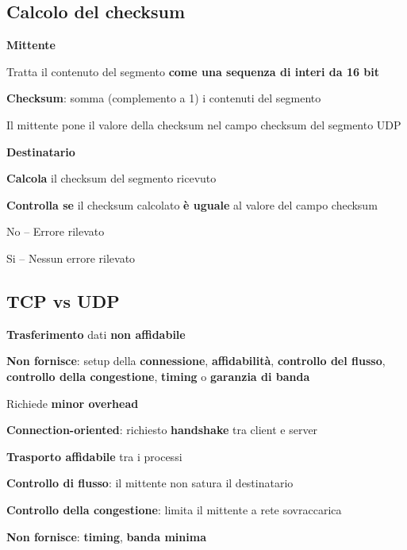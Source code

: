 \documentclass[10pt]{article}
\begin{document}
\subsection{Calcolo del checksum}
\textbf{Mittente}
\begin{list}{}{}
\item Tratta il contenuto del segmento \textbf{come una sequenza di interi da 16 bit}
\item \textbf{Checksum}: somma (complemento a 1) i contenuti del segmento
\item Il mittente pone il valore della checksum nel campo checksum del segmento UDP
\end{list}
\textbf{Destinatario}
\begin{list}{}{}
\item \textbf{Calcola} il checksum del segmento ricevuto
\item \textbf{Controlla se} il checksum calcolato \textbf{è uguale} al valore del campo checksum
\begin{list}{}{}
\item No -- Errore rilevato
\item Si -- Nessun errore rilevato
\end{list}
\end{list}
\pagebreak
\subsection{TCP vs UDP}
\begin{multicols}{2}
\begin{list}{}{\textbf{UDP}}
\item \textbf{Trasferimento} dati \textbf{non affidabile}
\item \textbf{Non fornisce}: setup della \textbf{connessione}, \textbf{affidabilità}, \textbf{controllo del flusso}, \textbf{controllo della congestione}, \textbf{timing} o \textbf{garanzia di banda}
\item Richiede \textbf{minor overhead}
\end{list}
\columnbreak
\begin{list}{}{\textbf{TCP}}
\item \textbf{Connection-oriented}: richiesto \textbf{handshake} tra client e server
\item \textbf{Trasporto affidabile} tra i processi
\item \textbf{Controllo di flusso}: il mittente non satura il destinatario
\item \textbf{Controllo della congestione}: limita il mittente a rete sovraccarica
\item \textbf{Non fornisce}: \textbf{timing}, \textbf{banda minima}
\end{list}
\end{multicols}
\end{document}
